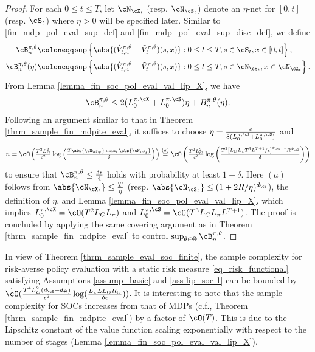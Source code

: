 \documentclass[9pt]{article}
\numberwithin{equation}{section}
\renewcommand{\frac}[2]{\tfrac{#1}{#2}}
\begin{document}
\begin{proof}
    For each $0 \leq t \leq T$, let $\cN_{\cX_t}$ (resp. $\cN_{\cS_t}$) denote an $\eta$-net for $[0,t]$ (resp. $\cS_t$) where $\eta > 0$ will be specified later. Similar to \eqref{fin_mdp_pol_eval_sup_def} and \eqref{fin_mdp_pol_eval_sup_disc_def}, we define
    \begin{align}
        \cB_n^{\pi, \theta} & \coloneqq \sup \left\{ \abs{(\hat{V}_{t,n}^{\pi, \theta} - \tilde{V}_t^{\pi, \theta})(s,x)} : 0 \leq t \leq T, s \in \cS_t, x \in [0,t] \right\}, \label{fin_soc_pol_eval_sup_def} \\
        \cB_n^{\pi, \theta}(\eta) & \coloneqq \sup \left\{ \abs{(\hat{V}_{t,n}^{\pi, \theta} - \tilde{V}_t^{\pi, \theta})(s,x)} : 0 \leq t \leq T, s \in \cN_{\cS_t}, x \in \cN_{\cX_t} \right\}. \nonumber
    \end{align}
    From Lemma \ref{lemma_fin_soc_pol_eval_val_lip_X}, we have
    \begin{align}
        \cB_n^{\pi, \theta} \leq 2(L_{0}^{\pi,\cX} + L_{0}^{\pi,\cS})\eta + B_n^{\pi, \theta}(\eta). \label{fin_soc_pol_eval_gen_bound}
    \end{align}
    Following an argument similar to that in Theorem \ref{thrm_sample_fin_mdpite_eval}, it suffices to choose $\eta = \tfrac{\epsilon}{8(L_0^{\pi, \cX} + L_0^{\pi, \cS})}$ and
    \begin{align}
        n = \cO\left( \tfrac{T^2 L_C^2 }{\epsilon^2} \log \left(\tfrac{T \abs{\cN_{\cX_T}} \max_{t}\abs{\cN_{\cS_t}}}{\delta}\right)\right) \overset{(a)}{=} \cO\left( \tfrac{T^2 L_C^2}{\epsilon^2} \log \left(\tfrac{T^2\left[L_C L_\pi T^3 L^{T+1}/\epsilon\right]^{d_\cS + 1} R^{d_\cS}}{\delta}\right)\right) \nonumber
    \end{align}
    to ensure that $\cB_n^{\pi, \theta} \leq \tfrac{3 \epsilon}{4}$ holds with probability at least $1-\delta$. Here $(a)$ follows from $\abs{\cN_{\cX_t}} \leq \tfrac{T}{\eta}$ (resp. $\abs{\cN_{\cS_t}} \leq (1 + 2R/\eta)^{d_\cS}$), the definition of $\eta$, and Lemma \ref{lemma_fin_soc_pol_eval_val_lip_X}, which implies  $L_0^{\pi, \cX} = \cO(T^2 L_C L_\pi)$ and $L_0^{\pi, \cS} = \cO(T^3 L_C L_\pi L^{T+1})$. The proof is concluded by applying the same covering argument as in Theorem \ref{thrm_sample_fin_mdpite_eval} to control $\sup_{\theta \in \Theta} \cB_n^{\pi, \theta}$.
\end{proof}

In view of Theorem \ref{thrm_sample_eval_soc_finite}, the sample complexity for risk-averse policy evaluation with a static risk measure \eqref{eq_risk_functional} satisfying Assumptions \ref{assump_basic} and \ref{ass-lip_soc-1} can be bounded by 
$\tilde{\cO}(\frac{T^4 L_C^2 (d_\cS + d_\Theta)}{\epsilon^2} \log(\tfrac{L_\pi L L_\Theta R_\Theta}{\delta \epsilon}))$.
It is interesting to note that the sample complexity for SOCs increases from that of MDPs (c.f., Theorem \ref{thrm_sample_fin_mdpite_eval}) by a factor of $\cO(T)$.
This is due to the Lipschitz constant of the value function scaling exponentially with respect to the number of stages (Lemma \ref{lemma_fin_soc_pol_eval_val_lip_X}).
\end{document}
